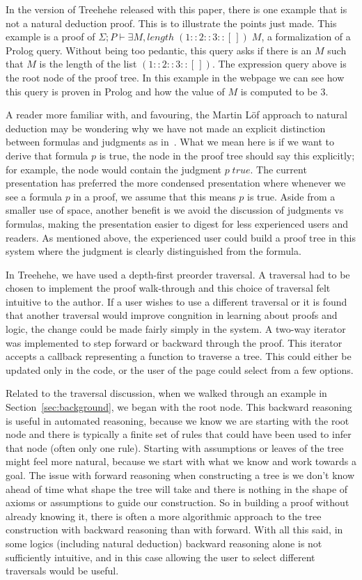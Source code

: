 \documentclass[conference]{IEEEtran}
\newcommand{\projectname}{Treehehe}
\begin{document}
In the version of \projectname{} released with this paper, there is one example that is not a natural deduction proof. This is to illustrate the points just made. This example is a proof of $\Sigma ; P \vdash \exists M, \mathit{length} \; (1 :: 2 :: 3 :: [ \, ]) \; M$, a formalization of a Prolog query. Without being too pedantic, this query asks if there is an $M$ such that $M$ is the length of the list $(1 :: 2 :: 3 :: [\, ])$. The expression query above is the root node of the proof tree. In this example in the webpage we can see how this query is proven in Prolog and how the value of $M$ is computed to be 3.

A reader more familiar with, and favouring, the Martin L{\"o}f approach to natural deduction may be wondering why we have not made an explicit distinction between formulas and judgments as in~\cite{natded-pfenning}. What we mean here is if we want to derive that formula $p$ is true, the node in the proof tree should say this explicitly; for example, the node would contain the judgment $p \; \mathit{true}$. The current presentation has preferred the more condensed presentation where whenever we see a formula $p$ in a proof, we assume that this means $p$ is true. Aside from a smaller use of space, another benefit is we avoid the discussion of judgments vs formulas, making the presentation easier to digest for less experienced users and readers. As mentioned above, the experienced user could build a proof tree in this system where the judgment is clearly distinguished from the formula.

In \projectname{}, we have used a depth-first preorder traversal. A traversal had to be chosen to implement the proof walk-through and this choice of traversal felt intuitive to the author. If a user wishes to use a different traversal or it is found that another traversal would improve congnition in learning about proofs and logic, the change could be made fairly simply in the system. A two-way iterator was implemented to step forward or backward through the proof. This iterator accepts a callback representing a function to traverse a tree. This could either be updated only in the code, or the user of the page could select from a few options.

Related to the traversal discussion, when we walked through an example in Section~\ref{sec:background}, we began with the root node. This backward reasoning is useful in automated reasoning, because we know we are starting with the root node and there is typically a finite set of rules that could have been used to infer that node (often only one rule). Starting with assumptions or leaves of the tree might feel more natural, because we start with what we know and work towards a goal. The issue with forward reasoning when constructing a tree is we don't know ahead of time what shape the tree will take and there is nothing in the shape of axioms or assumptions to guide our construction. So in building a proof without already knowing it, there is often a more algorithmic approach to the tree construction with backward reasoning than with forward. With all this said, in some logics (including natural deduction) backward reasoning alone is not sufficiently intuitive, and in this case allowing the user to select different traversals would be useful.
\end{document}
